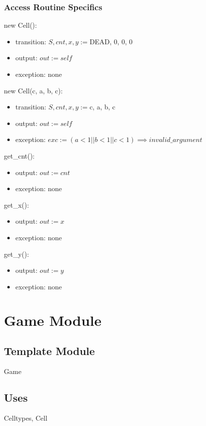 \documentclass[]{article}
\begin{document}
\subsubsection*{Access Routine Specifics}
new Cell():
\begin{itemize}
\item transition: $S, cnt, x, y := $DEAD, 0, 0, 0

\item output: $\mathit{out} := \mathit{self}$
\item exception: none
\end{itemize}

new Cell(c, a, b, c):
\begin{itemize}
\item transition: $S, cnt, x, y := $c, a, b, c
\item output: $\mathit{out} := \mathit{self}$
\item exception: $exc := (a < 1 || b < 1 || c < 1 ) \implies invalid\_argument$
\end{itemize}

\noindent get\_cnt():
\begin{itemize}
\item output: $out := cnt$
\item exception: none
\end{itemize}

\noindent get\_x():
\begin{itemize}
\item output: $out := x$
\item exception: none
\end{itemize}

\noindent get\_y():
\begin{itemize}
\item output: $out := y$
\item exception: none
\end{itemize}
\newpage


\section*{Game Module}
\subsection*{Template Module}
Game

\subsection*{Uses}
Celltypes, Cell
\end{document}
